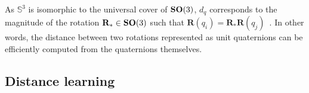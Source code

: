 As $\mathbb{S}^3$ is isomorphic to the universal cover of $\mathrm{\mathbf{SO}}(3)$, $d_q$ corresponds to the magnitude of the rotation $\mathbf{R}_* \in \mathrm{\mathbf{SO}}(3)$ such that $\mathbf{R}(q_i) = \mathbf{R}_* \mathbf{R}(q_j)$~\cite{huynh2009metrics}.
In other words, the distance between two rotations represented as unit quaternions can be efficiently computed from the quaternions themselves.



\subsection{Distance learning}\label{sec:method:distance-learning}



